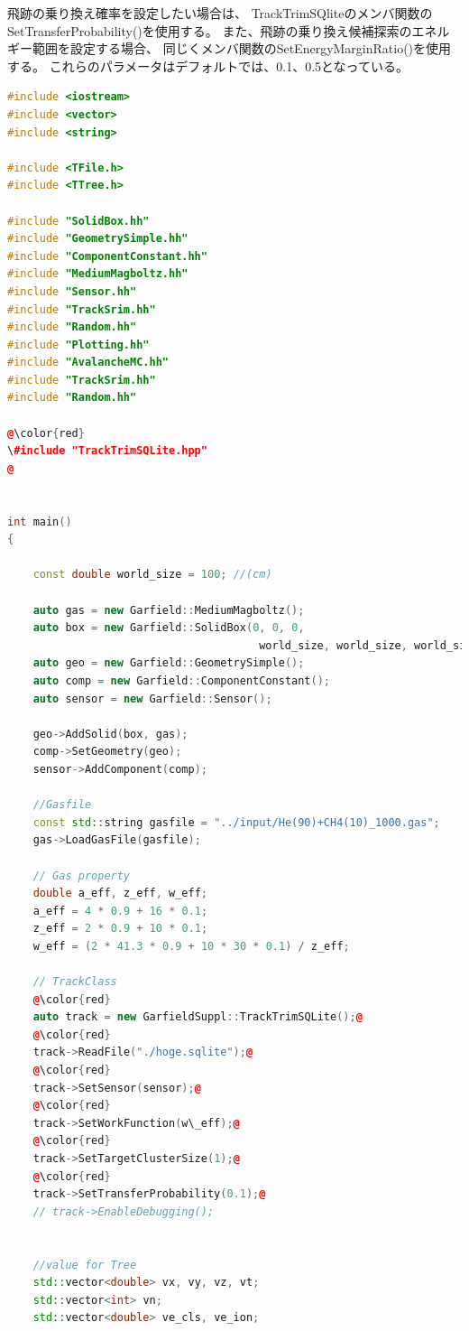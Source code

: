 \documentclass [11pt,a4paper,dvipdfmx] {jarticle}
\begin{document}
飛跡の乗り換え確率を設定したい場合は、
TrackTrimSQliteのメンバ関数のSetTransferProbability()を使用する。
また、飛跡の乗り換え候補探索のエネルギー範囲を設定する場合、
同じくメンバ関数のSetEnergyMarginRatio()を使用する。
これらのパラメータはデフォルトでは、0.1、0.5となっている。


\begin{lstlisting}[caption=testTrackTrimSQLite.cpp (TrackTrimSQLiteの使用例。),language={C++},label=lstTrackTrimSQLite]
#include <iostream>
#include <vector>
#include <string>

#include <TFile.h>
#include <TTree.h>

#include "SolidBox.hh"
#include "GeometrySimple.hh"
#include "ComponentConstant.hh"
#include "MediumMagboltz.hh"
#include "Sensor.hh"
#include "TrackSrim.hh"
#include "Random.hh"
#include "Plotting.hh"
#include "AvalancheMC.hh"
#include "TrackSrim.hh"
#include "Random.hh"

@\color{red}
\#include "TrackTrimSQLite.hpp"
@


int main()
{

    const double world_size = 100; //(cm)

    auto gas = new Garfield::MediumMagboltz();
    auto box = new Garfield::SolidBox(0, 0, 0,
                                       world_size, world_size, world_size);
    auto geo = new Garfield::GeometrySimple();
    auto comp = new Garfield::ComponentConstant();
    auto sensor = new Garfield::Sensor();

    geo->AddSolid(box, gas);
    comp->SetGeometry(geo);
    sensor->AddComponent(comp);

    //Gasfile
    const std::string gasfile = "../input/He(90)+CH4(10)_1000.gas";
    gas->LoadGasFile(gasfile);

    // Gas property
    double a_eff, z_eff, w_eff;
    a_eff = 4 * 0.9 + 16 * 0.1;
    z_eff = 2 * 0.9 + 10 * 0.1;
    w_eff = (2 * 41.3 * 0.9 + 10 * 30 * 0.1) / z_eff;

    // TrackClass
    @\color{red}
    auto track = new GarfieldSuppl::TrackTrimSQLite();@
    @\color{red}
    track->ReadFile("./hoge.sqlite");@
    @\color{red}
    track->SetSensor(sensor);@
    @\color{red}
    track->SetWorkFunction(w\_eff);@
    @\color{red}
    track->SetTargetClusterSize(1);@
    @\color{red}
    track->SetTransferProbability(0.1);@
    // track->EnableDebugging();
    

    //value for Tree
    std::vector<double> vx, vy, vz, vt;
    std::vector<int> vn;
    std::vector<double> ve_cls, ve_ion;


\end{lstlisting}
\end{document}
